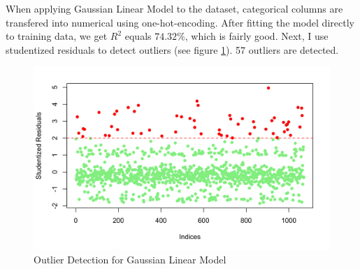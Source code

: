 \documentclass{article}
\begin{document}
When applying Gaussian Linear Model to the dataset, categorical columns are transfered into numerical using one-hot-encoding. After fitting the model directly to training data, we get $R^2$ equals $74.32\%$, which is fairly good. Next, I use studentized residuals to detect outliers (see figure \ref{fig:outlier_glm}). 57 outliers are detected.
\begin{figure}[!ht]
	\centering
	\includegraphics[width=0.8\linewidth]{images/outlier_glm.png}
	\caption{Outlier Detection for Gaussian Linear Model}
	\label{fig:outlier_glm}
\end{figure}
\end{document}
